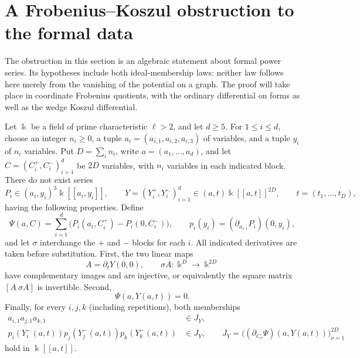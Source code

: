 \section{A Frobenius--Koszul obstruction to the formal data}
\label{frob:section}
\label{sec:frobenius}

The obstruction in this section is an algebraic statement about formal
power series.  Its hypotheses include both ideal-membership laws: neither
law follows here merely from the vanishing of the potential on a graph.
The proof will take place in coordinate Frobenius quotients, with the
ordinary differential on forms as well as the wedge Koszul differential.

\begin{theorem}
\label{frob:no-data}
Let $\Bbbk$ be a field of prime characteristic $\ell>2$, and let
$d\geq5$.  For $1\leq i\leq d$, choose an integer $n_i\geq0$, a tuple
$a_i=(a_{i,1},a_{i,2},a_{i,3})$ of variables, and a tuple $y_i$ of
$n_i$ variables.
Put $D=\sum_i n_i$, write $a=(a_1,\ldots,a_d)$, and let
$C=(C_i^+,C_i^-)_{i=1}^d$ be $2D$ variables, with $n_i$ variables in
each indicated block.  There do not exist series
\[
 P_i\in(a_i,y_i)^3\Bbbk[[a_i,y_i]],\qquad
 Y=(Y_i^+,Y_i^-)_{i=1}^d\in
       (a,t)\Bbbk[[a,t]]^{2D},\qquad t=(t_1,\ldots,t_D),
\]
having the following properties.  Define
\begin{equation}
 \Psi(a,C)=\sum_{i=1}^d
       \bigl(P_i(a_i,C_i^+)-P_i(0,C_i^-)\bigr),\qquad
 p_i(y_i)=(\partial_{a_{i,1}}P_i)(0,y_i),
 \label{frob:separated}
\end{equation}
and let $\sigma$ interchange the $+$ and $-$ blocks for each $i$.
All indicated derivatives are taken before substitution.
First, the two linear maps
\[
 A=\partial_tY(0,0),\qquad \sigma A:
                  \Bbbk^D\longrightarrow\Bbbk^{2D}
\]
have complementary images and are injective, or equivalently the square
matrix $[A\ \sigma A]$ is invertible.  Second,
\begin{equation}
                         \Psi(a,Y(a,t))=0.
 \label{frob:graph-zero}
\end{equation}
Finally, for every $i,j,k$ (including repetitions), both memberships
\begin{equation}
 \begin{split}
 a_{i,1}a_{j,1}a_{k,1}&\in J_Y,\\
 p_i(Y_i^-(a,t))p_j(Y_j^-(a,t))p_k(Y_k^-(a,t))&\in J_Y,
 \qquad
 J_Y=\bigl((\partial_{C_\nu}\Psi)(a,Y(a,t))\bigr)_{\nu=1}^{2D}
 \end{split}
 \label{frob:memberships}
\end{equation}
hold in $\Bbbk[[a,t]]$.
\end{theorem}

